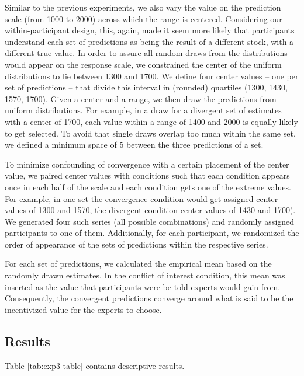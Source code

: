 \documentclass[
  doc,floatsintext]{apa6}
\begin{document}
Similar to the previous experiments, we also vary the value on the prediction scale (from 1000 to 2000) across which the range is centered. Considering our within-participant design, this, again, made it seem more likely that participants understand each set of predictions as being the result of a different stock, with a different true value. In order to assure all random draws from the distributions would appear on the response scale, we constrained the center of the uniform distributions to lie between 1300 and 1700. We define four center values -- one per set of predictions -- that divide this interval in (rounded) quartiles (1300, 1430, 1570, 1700). Given a center and a range, we then draw the predictions from uniform distributions. For example, in a draw for a divergent set of estimates with a center of 1700, each value within a range of 1400 and 2000 is equally likely to get selected. To avoid that single draws overlap too much within the same set, we defined a minimum space of 5 between the three predictions of a set.

To minimize confounding of convergence with a certain placement of the center value, we paired center values with conditions such that each condition appears once in each half of the scale and each condition gets one of the extreme values. For example, in one set the convergence condition would get assigned center values of 1300 and 1570, the divergent condition center values of 1430 and 1700). We generated four such series (all possible combinations) and randomly assigned participants to one of them. Additionally, for each participant, we randomized the order of appearance of the sets of predictions within the respective series.

For each set of predictions, we calculated the empirical mean based on the randomly drawn estimates. In the conflict of interest condition, this mean was inserted as the value that participants were be told experts would gain from. Consequently, the convergent predictions converge around what is said to be the incentivized value for the experts to choose.

\subsection{Results}\label{results-2}

Table \ref{tab:exp3-table} contains descriptive results.
\end{document}

